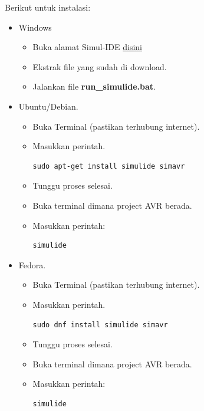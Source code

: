 \documentclass[12pt,]{article}
\begin{document}
	Berikut untuk instalasi:
	\begin{itemize}
		\item Windows
		\begin{itemize}
			\item Buka alamat Simul-IDE \href{https://sourceforge.net/projects/simulide/files/SimulIDE_0.3.10/SimulIDE_0.3.10_SR1-Win32.zip/download}{disini}
			\item Ekstrak file yang sudah di download.
			\item Jalankan file \textbf{run\_simulide.bat}.
		\end{itemize}
	
		\item Ubuntu/Debian.
		\begin{itemize}
			\item Buka Terminal (pastikan terhubung internet).
			\item Masukkan perintah.
			\begin{verbatim}
sudo apt-get install simulide simavr
			\end{verbatim}
			\item Tunggu proses selesai.
			\item Buka terminal dimana project AVR berada.
			\item Masukkan perintah:
			\begin{verbatim}
simulide
			\end{verbatim}
		\end{itemize}
	
		\item Fedora.
		\begin{itemize}
			\item Buka Terminal (pastikan terhubung internet).
			\item Masukkan perintah.
			\begin{verbatim}
sudo dnf install simulide simavr
			\end{verbatim}
			\item Tunggu proses selesai.
			\item Buka terminal dimana project AVR berada.
			\item Masukkan perintah:
			\begin{verbatim}
simulide
			\end{verbatim}
		\end{itemize}
	

\end{itemize}
\end{document}
